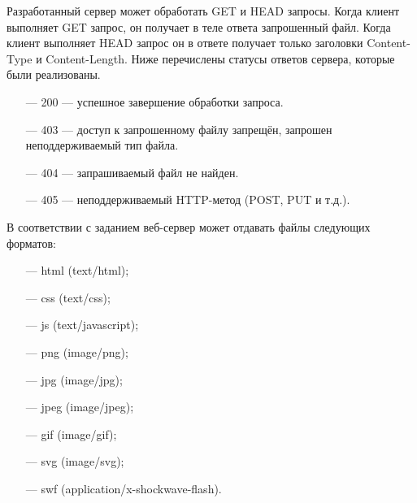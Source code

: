 Разработанный сервер может обработать GET и HEAD запросы. Когда клиент выполняет GET запрос, он получает в теле ответа запрошенный файл. Когда клиент выполняет HEAD запрос он в ответе получает только заголовки Content-Type и Content-Length. Ниже перечислены статусы ответов сервера, которые были реализованы.
\begin{itemize}
	\item[---] 200 — успешное завершение обработки запроса.
	\item[---] 403 — доступ к запрошенному файлу запрещён, запрошен неподдерживаемый тип файла.
	\item[---] 404 — запрашиваемый файл не найден.
	\item[---] 405 — неподдерживаемый HTTP-метод (POST, PUT и т.д.).
\end{itemize}

В соответствии с заданием веб-сервер может отдавать файлы следующих форматов:
\begin{itemize}
	\item[---] html (text/html);
	\item[---] css (text/css);
	\item[---] js (text/javascript);
	\item[---] png (image/png);
	\item[---] jpg (image/jpg);
	\item[---] jpeg (image/jpeg);
	\item[---] gif (image/gif);
	\item[---] svg (image/svg);
	\item[---] swf (application/x-shockwave-flash).
\end{itemize}

